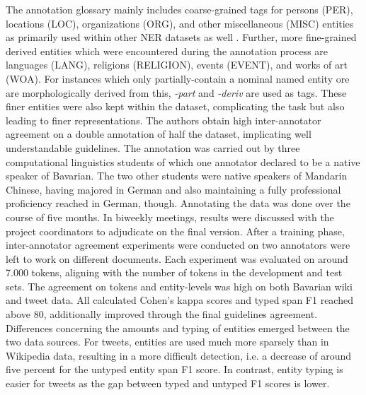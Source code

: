 \documentclass[11pt,a4paper,twoside,openright]{scrbook}
\begin{document}
The annotation glossary mainly includes coarse-grained tags for persons (PER), locations (LOC), organizations (ORG), and other miscellaneous (MISC) entities as primarily used within other NER datasets as well \citep{peng-etal-2024-sebastian-basti}. Further, more fine-grained derived entities which were encountered during the annotation process are languages (LANG), religions (RELIGION), events (EVENT), and works of art (WOA). For instances which only partially-contain a nominal named entity ore are morphologically derived from this, \textit{-part} and \textit{-deriv} are used as tags. These finer entities were also kept within the dataset, complicating the task but also leading to finer representations. The authors obtain high inter-annotator agreement on a double annotation of half the dataset, implicating well understandable guidelines. The annotation was carried out by three computational linguistics students of which one annotator declared to be a native speaker of Bavarian. The two other students were native speakers of Mandarin Chinese, having majored in German and also maintaining a fully professional proficiency reached in German, though. Annotating the data was done over the course of five months. In biweekly meetings, results were discussed with the project coordinators to adjudicate on the final version. After a training phase, inter-annotator agreement experiments were conducted on two annotators were left to work on different documents. Each experiment was evaluated on around 7.000 tokens, aligning with the number of tokens in the development and test sets. The agreement on tokens and entity-levels was high on both Bavarian wiki and tweet data. All calculated Cohen’s kappa scores and typed span F1 reached above 80, additionally improved through the final guidelines agreement. Differences concerning the amounts and typing of entities emerged between the two data sources. For tweets, entities are used much more sparsely than in Wikipedia data, resulting in a more difficult detection, i.e. a decrease of around five percent for the untyped entity span F1 score. In contrast, entity typing is easier for tweets as the gap between typed and untyped F1 scores is lower. 
\end{document}

